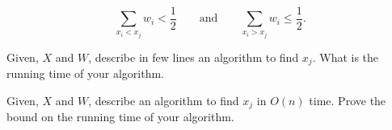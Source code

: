 \begin{questions}[start=13]
{\begin{questions}
           \begin{equation*}
               \sum_{x_i<x_j}{w_i} < \frac{1}{2}
               \qquad\text{and}\qquad
               \sum_{x_i>x_j}{w_i} \le \frac{1}{2}.
           \end{equation*}
           
           \item {} Given, $X$ and $W$, describe in few lines
           an algorithm to find $x_j$. What is the running time of
           your algorithm.
           
		   
	   \item {} Given, $X$ and $W$, describe an algorithm
           to find $x_j$ in $O(n)$ time. Prove the bound on the
           running time of your algorithm.

       \end{questions}
    }{}{}{}%

\end{questions}

\HomeworkEnd{}

